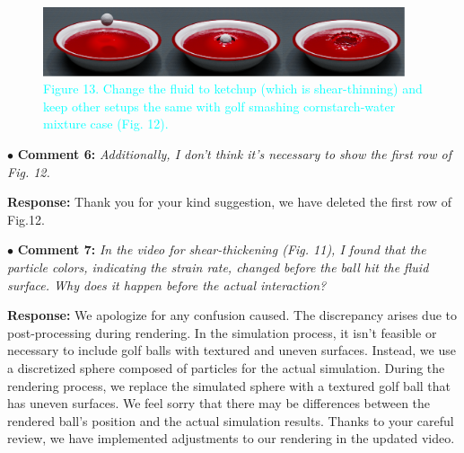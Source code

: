 \documentclass[12pt,a4paper]{article}
\newcommand{\revised}[1]{\textcolor{cyan}{#1}}
\begin{document}
\begin{figure}[htbp]
	\centering
	\includegraphics[width=0.95\textwidth]{pics/ketchup.png}
	\captionsetup{labelformat=empty}
	\caption{\revised{Figure 13. Change the fluid to ketchup (which is shear-thinning) and keep other setups the same with golf smashing cornstarch-water mixture case (Fig. 12).}} 
\end{figure}



\vspace{0.4cm}
\noindent$\bullet$ \enspace \textbf{Comment 6:}
\textit{Additionally, I don't think it's necessary to show the first row of Fig. 12. }


\vspace{0.2cm}
\textbf{Response:}
Thank you for your kind suggestion, we have deleted the first row of Fig.12.


\vspace{0.4cm}
\noindent$\bullet$ \enspace \textbf{Comment 7:}
\textit{In the video for shear-thickening (Fig. 11), I found that the particle colors, indicating the strain rate, changed before the ball hit the fluid surface. Why does it happen before the actual interaction? }


\vspace{0.2cm}
\textbf{Response:}
We apologize for any confusion caused. The discrepancy arises due to post-processing during rendering. In the simulation process, it isn't feasible or necessary to include golf balls with textured and uneven surfaces. Instead, we use a discretized sphere composed of particles for the actual simulation. During the rendering process, we replace the simulated sphere with a textured golf ball that has uneven surfaces. We feel sorry that there may be differences between the rendered ball's position and the actual simulation results.
Thanks to your careful review, we have implemented adjustments to our rendering in the updated video.


\end{document}
